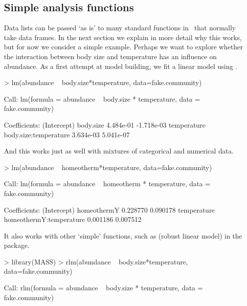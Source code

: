 \documentclass[a4paper]{report}
\numberwithin{exercise}{section}
\begin{document}
\begin{article}
\section{Simple analysis functions}

Data lists can be passed `as is' to many standard functions in \R\ that normally take data frames.  In the next section we explain in more detail why this works, but for now we consider a simple example.  Perhaps we want to explore whether the interaction between body size and temperature has an influence on abundance.  As a first attempt at model building, we fit a linear model using .
\begin{Schunk}
\begin{Sinput}
> lm(abundance ~ body.size*temperature,
 data=fake.community)
\end{Sinput}
\begin{Soutput}
Call:
lm(formula = abundance ~ body.size * temperature, 
    data = fake.community)

Coefficients:
          (Intercept)              body.size  
            4.484e-01             -1.718e-03  
          temperature  body.size:temperature  
            3.634e-03              5.041e-07  
\end{Soutput}
\end{Schunk}
And this works just as well with mixtures of categorical and numerical data.
\begin{Schunk}
\begin{Sinput}
> lm(abundance ~ homeotherm*temperature,
 data=fake.community)
\end{Sinput}
\begin{Soutput}
Call:
lm(formula = abundance ~ homeotherm * temperature, 
    data = fake.community)

Coefficients:
            (Intercept)              homeothermY  
               0.228770                 0.090178  
            temperature  homeothermY:temperature  
               0.001186                 0.007512  
\end{Soutput}
\end{Schunk}
It also works with other `simple' functions, such as  (robust linear model) in the  package.
\begin{Schunk}
\begin{Sinput}
> library(MASS)
> rlm(abundance ~ body.size*temperature,
 data=fake.community)
\end{Sinput}
\begin{Soutput}
Call:
rlm(formula = abundance ~ body.size * temperature, 
    data = fake.community)


\end{Soutput}
\end{Schunk}
\end{article}
\end{document}
